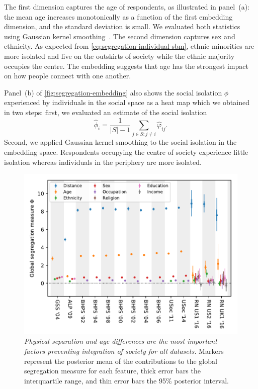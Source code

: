 \documentclass{scrartcl}
\newcommand{\card}[1]{\left|#1\right|}
\newcommand{\titlecaption}[2]{\caption[#1]{\emph{#1} #2}}
\begin{document}
The first dimension captures the age of respondents, as illustrated in panel~(a): the mean age increases monotonically as a function of the first embedding dimension, and the standard deviation is small. We evaluated both statistics using Gaussian kernel smoothing~\cite[chapter~6]{Hastie2009}. The second dimension captures sex and ethnicity. As expected from \cref{eq:segregation-individual-sbm}, ethnic minorities are more isolated and live on the outskirts of society while the ethnic majority occupies the centre. The embedding suggests that age has the strongest impact on how people connect with one another.

Panel~(b) of \cref{fig:segregation-embedding} also shows the social isolation $\phi$ experienced by individuals in the social space as a heat map which we obtained in two steps: first, we evaluated an estimate of the social isolation
\[
    \hat\phi_i = \frac{1}{\card{S}-1}\sum_{j\in S:j\neq i} \hat\varphi_{ij}.
\]
Second, we applied Gaussian kernel smoothing to the social isolation in the embedding space. Respondents occupying the centre of society experience little isolation whereas individuals in the periphery are more isolated.

\begin{figure}
    \includegraphics{segregation-survey}
    \titlecaption{Physical separation and age differences are the most important factors preventing integration of society for all datasets.}{Markers represent the posterior mean of the contributions to the global segregation measure for each feature, thick error bars the interquartile range, and thin error bars the 95\% posterior interval.\label{fig:segregation-survey}}
\end{figure}
\end{document}
